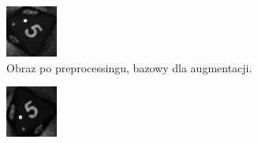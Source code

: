 \begin{figure}[h]
    \centering
    \begin{subfigure}[t]{0.32\linewidth}
        \centering
        \includegraphics[width=\linewidth]{chapters/04-czytanie/figures/5_preprocessed}
        \caption{Obraz po preprocessingu, bazowy dla augmentacji.}
        \label{fig:5raw}
    \end{subfigure}
    \hfill
    \begin{subfigure}[t]{0.32\linewidth}
        \centering
        \includegraphics[width=\linewidth]{chapters/04-czytanie/figures/5_rotate}

\end{subfigure}
\end{figure}

